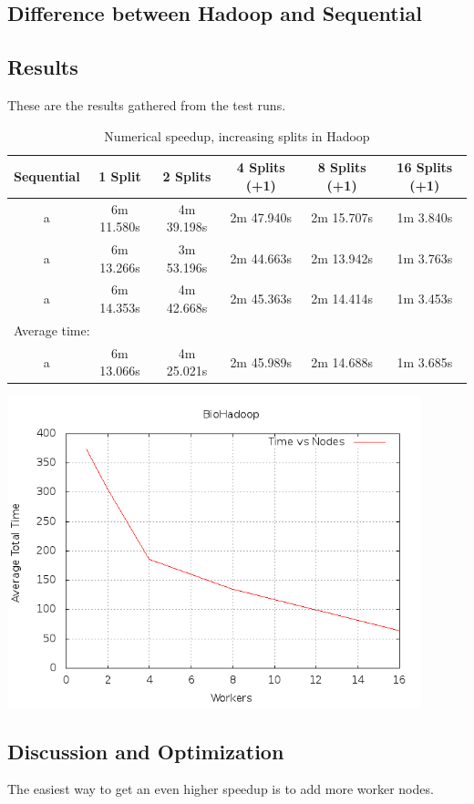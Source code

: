 \documentclass[a4paper]{article}
\begin{document}
  \subsection{Difference between Hadoop and Sequential}
    
  
  \subsection{Results}
    These are the results gathered from the test runs.
    \begin{table}[H]
	    \label{table:hadoop}
	    \begin{center}
		    \begin{tabular}{| c | c | c | c | c | c |}
			    \hline
			    Sequential & 1 Split & 2 Splits & 4 Splits (+1) & 8 Splits (+1) & 16 Splits (+1)\\ 
			    \hline
			    a & 6m 11.580s & 4m 39.198s & 2m 47.940s & 2m 15.707s & 1m 3.840s\\
			    \hline
			    a & 6m 13.266s & 3m 53.196s & 2m 44.663s & 2m 13.942s & 1m 3.763s\\
			    \hline
			    a & 6m 14.353s & 4m 42.668s & 2m 45.363s & 2m 14.414s & 1m 3.453s\\
			    \hline
			    \multicolumn{6}{|l|}{Average time:}\\
			    \hline
			    a & 6m 13.066s & 4m 25.021s & 2m 45.989s & 2m 14.688s & 1m 3.685s\\
			    \hline
		    \end{tabular}
  	    \caption{Numerical speedup, increasing splits in Hadoop}
	    \end{center}
    \end{table}
    \begin{center}
      \includegraphics[width=0.9\textwidth]{speedplot.png}
    \end{center}
    
  \subsection{Discussion and Optimization}
    The easiest way to get an even higher speedup is to add more worker nodes.
  
\end{document}

